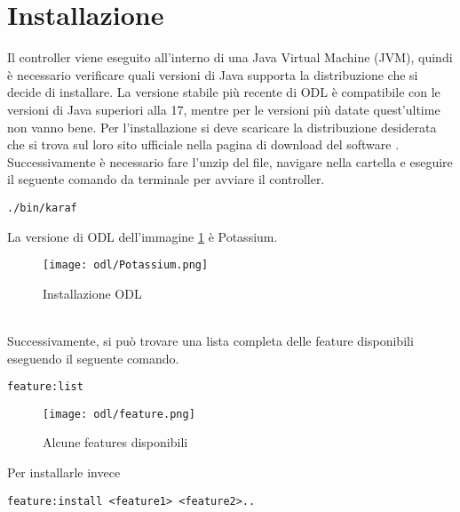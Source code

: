 \section {Installazione}
Il controller viene eseguito all'interno di una Java Virtual Machine (JVM), quindi è necessario verificare quali versioni di Java supporta la distribuzione che si decide di installare.
La versione stabile più recente di ODL è compatibile con le versioni di Java superiori alla 17, mentre per le versioni più datate quest'ultime non vanno bene. 
Per l'installazione si deve scaricare la distribuzione desiderata che si trova sul loro sito ufficiale nella pagina di download del software \cite{InstallODL}.
Successivamente è necessario fare l'unzip del file, navigare nella cartella e eseguire il seguente comando da terminale per avviare il controller.
\begin{lstlisting}[language=CLI]
./bin/karaf
\end{lstlisting}
La versione di ODL dell'immagine \ref{fig:installazione} è Potassium.
\begin{figure}[h]
    \centering
   \texttt{[image: odl/Potassium.png]}
    \caption{Installazione ODL}
    \label{fig:installazione}
\end{figure}
\\Successivamente, si può trovare una lista completa delle feature disponibili eseguendo il seguente comando.
\begin{lstlisting}[language=CLI]
feature:list
\end{lstlisting}
\begin{figure}[h]
    \centering
   \texttt{[image: odl/feature.png]}
    \caption{Alcune features disponibili}
    \label{fig:feature}
\end{figure}
Per installarle invece 
\begin{lstlisting}[language=CLI]
feature:install <feature1> <feature2>..
\end{lstlisting}
